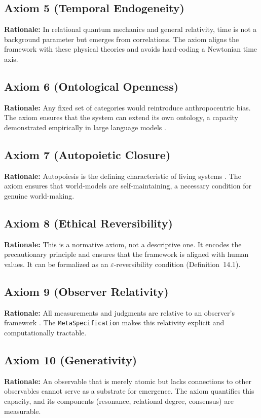 \subsection*{Axiom 5 (Temporal Endogeneity)}
\textbf{Rationale:} In relational quantum mechanics \cite{rovelli1996} and general relativity, time is not a background parameter but emerges from correlations. The axiom aligns the framework with these physical theories and avoids hard-coding a Newtonian time axis.

\subsection*{Axiom 6 (Ontological Openness)}
\textbf{Rationale:} Any fixed set of categories would reintroduce anthropocentric bias. The axiom ensures that the system can extend its own ontology, a capacity demonstrated empirically in large language models \cite{wei2022}.

\subsection*{Axiom 7 (Autopoietic Closure)}
\textbf{Rationale:} Autopoiesis is the defining characteristic of living systems \cite{maturana1980}. The axiom ensures that world-models are self-maintaining, a necessary condition for genuine world-making.

\subsection*{Axiom 8 (Ethical Reversibility)}
\textbf{Rationale:} This is a normative axiom, not a descriptive one. It encodes the precautionary principle and ensures that the framework is aligned with human values. It can be formalized as an $\varepsilon$-reversibility condition (Definition~14.1).

\subsection*{Axiom 9 (Observer Relativity)}
\textbf{Rationale:} All measurements and judgments are relative to an observer's framework \cite{barad2007}. The \texttt{MetaSpecification} makes this relativity explicit and computationally tractable.

\subsection*{Axiom 10 (Generativity)}
\textbf{Rationale:} An observable that is merely atomic but lacks connections to other observables cannot serve as a substrate for emergence. The axiom quantifies this capacity, and its components (resonance, relational degree, consensus) are measurable.

